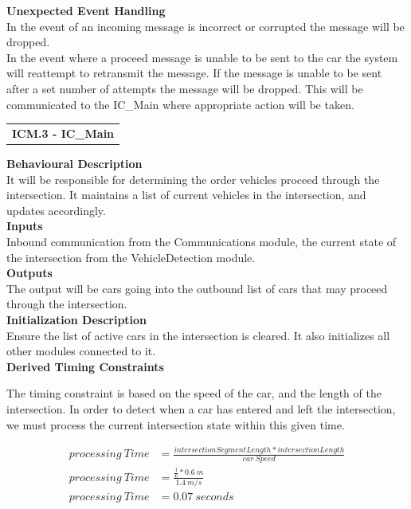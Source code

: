 \documentclass [10pt]{article}
\newcommand{\carSpeed}{1.4\ m/s}
\newcommand{\intersectionLength}{0.6\ m}
\begin{document}
\textbf{Unexpected Event Handling}\\
In the event of an incoming message is incorrect or corrupted the message will be dropped.  \\
In the event where a proceed message is unable to be sent to the car the system will reattempt to retransmit the message. If the message is unable to be sent after a set number of attempts the message will be dropped. This will be communicated to the IC\_Main where appropriate action will be taken. \\ 




\begin{longtable}{p{}}
\rowcolor{tableCell}\textbf{ICM.3 - IC\_Main} \\
\end{longtable}

\textbf{Behavioural Description} \\ %
    It will be responsible for determining the order vehicles proceed through the intersection. It maintains a list of current vehicles in the intersection, and updates accordingly. \\
    
\textbf{Inputs} \\
    Inbound communication from the Communications module, the current state of the intersection from the VehicleDetection module. \\

\textbf{Outputs} \\
    The output will be cars going into the outbound list of cars that may proceed through the intersection. \\

\textbf{Initialization Description} \\
    Ensure the list of active cars in the intersection is cleared. It also initializes all other modules connected to it. \\

\textbf{Derived Timing Constraints} 

The timing constraint is based on the speed of the car, and the length of the intersection. In order to detect when a car has entered and left the intersection, we must process the current intersection state within this given time.
     
    \begin{align*} 
      processing\ Time & = \frac{intersectionSegmentLength * intersectionLength}{car\ Speed}\\
      processing\ Time & = \frac{ \frac{1}{6} * \intersectionLength }{\carSpeed}\\
      processing \ Time & = 0.07\ seconds\\
    \end{align*}
  
\end{document}
